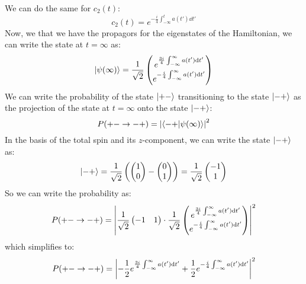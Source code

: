\documentclass[12pt]{article}
\begin{document}
We can do the same for $c_2(t)$:
\begin{equation}
  c_2(t) = e^{-\frac{i}{4}\int_{-\infty}^{t} a(t')\dd{t'}}
\end{equation}
Now, we that we have the propagors for the eigenstates of the Hamiltonian, we can write the state at $t=\infty$ as:
\begin{equation}
  \ket{\psi (\infty)} = \frac{1}{\sqrt{2}}\begin{pmatrix} e^{\frac{3i}{4}\int_{-\infty}^{\infty} a(t')\dd{t'}} \\ e^{-\frac{i}{4}\int_{-\infty}^{\infty} a(t')\dd{t'}} \end{pmatrix}
\end{equation}
We can write the probability of the state $\ket{+-}$ transitioning to the state $\ket{-+}$ as the projection of the state at $t=\infty$ onto the state $\ket{-+}$:
\begin{equation}
  P(+-\rightarrow-+) = \abs{\braket{-+}{\psi (\infty)}}^2
\end{equation}
In the basis of the total spin and its $z$-component, we can write the state $\ket{-+}$ as:
\begin{equation}
  \ket{-+} = \frac{1}{\sqrt{2}}\left( 
  \begin{pmatrix} 1 \\ 0 \end{pmatrix} - \begin{pmatrix} 0 \\ 1 \end{pmatrix}
  \right) = \frac{1}{\sqrt{2}}\begin{pmatrix} -1 \\ 1 \end{pmatrix}
\end{equation}
So we can write the probability as:
\begin{equation}
  P(+-\rightarrow-+) = \abs{\frac{1}{\sqrt{2}}\begin{pmatrix} -1 & 1 \end{pmatrix}\cdot \frac{1}{\sqrt{2}}\begin{pmatrix} e^{\frac{3i}{4}\int_{-\infty}^{\infty} a(t')\dd{t'}} \\ e^{-\frac{i}{4}\int_{-\infty}^{\infty} a(t')\dd{t'}} \end{pmatrix}}^2
\end{equation}
which simplifies to:
\begin{equation}
  P(+-\rightarrow-+) = \abs{-\frac{1}{2}e^{\frac{3i}{4}\int_{-\infty}^{\infty} a(t')\dd{t'}} + \frac{1}{2}e^{-\frac{i}{4}\int_{-\infty}^{\infty} a(t')\dd{t'}}}^2
\end{equation}
\end{document}
